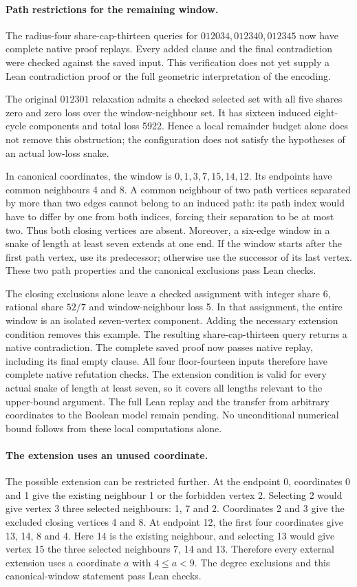\documentclass[11pt,a4paper]{article}
\begin{document}
\paragraph{Path restrictions for the remaining window.}
The radius-four share-cap-thirteen queries for $012034,012340,012345$
now have complete native proof replays. Every added clause and the final
contradiction were checked against the saved input. This verification
does not yet supply a Lean contradiction proof or the full geometric
interpretation of the encoding.

The original $012301$ relaxation admits a checked selected set with all
five shares zero and zero loss over the window-neighbour set. It has
sixteen induced eight-cycle components and total loss 5922. Hence a
local remainder budget alone does not remove this obstruction; the
configuration does not satisfy the hypotheses of an actual low-loss snake.

In canonical coordinates, the window is $0,1,3,7,15,14,12$. Its endpoints
have common neighbours 4 and 8. A common neighbour of two path vertices
separated by more than two edges cannot belong to an induced path:
its path index would have to differ by one from both indices, forcing
their separation to be at most two. Thus both closing vertices are absent.
Moreover, a six-edge window in a snake of length at least seven extends
at one end. If the window starts after the first path vertex, use its
predecessor; otherwise use the successor of its last vertex. These
two path properties and the canonical exclusions pass Lean checks.

The closing exclusions alone leave a checked assignment with integer
share 6, rational share $52/7$ and window-neighbour loss 5. In that
assignment, the entire window is an isolated seven-vertex component.
Adding the necessary extension condition removes this example. The
resulting share-cap-thirteen query returns a native contradiction.
The complete saved proof now passes native replay, including its final
empty clause. All four floor-fourteen inputs therefore have complete
native refutation checks.
The extension condition is valid for every actual snake of length at
least seven, so it covers all lengths relevant to the upper-bound argument.
The full Lean replay and the transfer from arbitrary coordinates to the
Boolean model remain pending. No unconditional numerical bound follows
from these local computations alone.

\paragraph{The extension uses an unused coordinate.}
The possible extension can be restricted further. At the endpoint 0,
coordinates 0 and 1 give the existing neighbour 1 or the forbidden vertex 2.
Selecting 2 would give vertex 3 three selected neighbours: 1, 7 and 2.
Coordinates 2 and 3 give the excluded closing vertices 4 and 8.
At endpoint 12, the first four coordinates give 13, 14, 8 and 4.
Here 14 is the existing neighbour, and selecting 13 would give vertex 15
the three selected neighbours 7, 14 and 13. Therefore every external
extension uses a coordinate $a$ with $4\le a<9$.
The degree exclusions and this canonical-window statement pass Lean checks.
\end{document}
